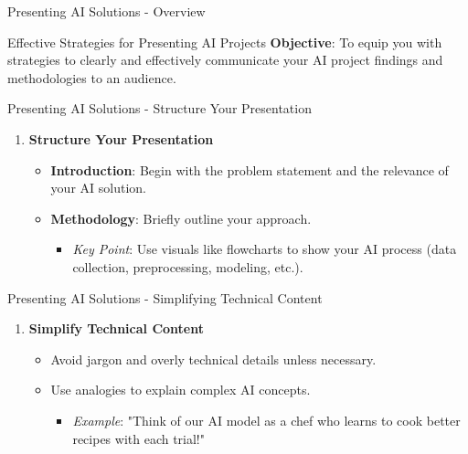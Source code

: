 \documentclass[aspectratio=169]{beamer}
\begin{document}
\begin{frame}[fragile]{Presenting AI Solutions - Overview}
    \begin{block}{Effective Strategies for Presenting AI Projects}
        \textbf{Objective}: To equip you with strategies to clearly and effectively communicate your AI project findings and methodologies to an audience.
    \end{block}
\end{frame}

\begin{frame}[fragile]{Presenting AI Solutions - Structure Your Presentation}
    \begin{enumerate}
        \item \textbf{Structure Your Presentation}
        \begin{itemize}
            \item \textbf{Introduction}: Begin with the problem statement and the relevance of your AI solution.
            \item \textbf{Methodology}: Briefly outline your approach.
            \begin{itemize}
                \item \textit{Key Point}: Use visuals like flowcharts to show your AI process (data collection, preprocessing, modeling, etc.).
            \end{itemize}
        \end{itemize}
    \end{enumerate}
\end{frame}

\begin{frame}[fragile]{Presenting AI Solutions - Simplifying Technical Content}
    \begin{enumerate}[resume]
        \item \textbf{Simplify Technical Content}
        \begin{itemize}
            \item Avoid jargon and overly technical details unless necessary.
            \item Use analogies to explain complex AI concepts.
            \begin{itemize}
                \item \textit{Example}: "Think of our AI model as a chef who learns to cook better recipes with each trial!"
            \end{itemize}
        \end{itemize}
    \end{enumerate}
\end{frame}
\end{document}
